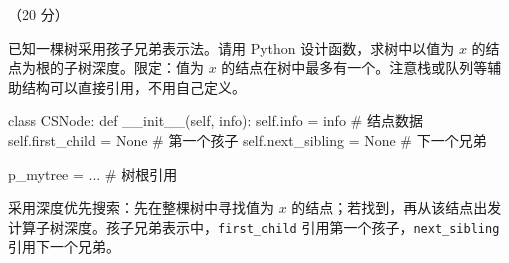 \begin{question}[求子树深度]（20 分）

已知一棵树采用孩子兄弟表示法。请用 Python 设计函数，求树中以值为 $x$ 的结点为根的子树深度。限定：值为 $x$ 的结点在树中最多有一个。注意栈或队列等辅助结构可以直接引用，不用自己定义。

\begin{pycode}
class CSNode:
    def __init__(self, info):
        self.info = info          # 结点数据
        self.first_child = None   # 第一个孩子
        self.next_sibling = None  # 下一个兄弟

p_mytree = ...                    # 树根引用
\end{pycode}

\begin{solution}
采用深度优先搜索：先在整棵树中寻找值为 $x$ 的结点；若找到，再从该结点出发计算子树深度。孩子兄弟表示中，\texttt{first\_child} 引用第一个孩子，\texttt{next\_sibling} 引用下一个兄弟。


\end{solution}
\end{question}
